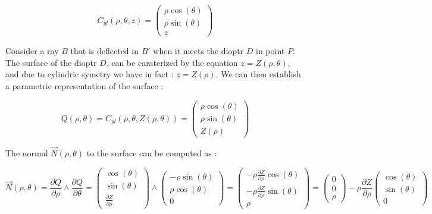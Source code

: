 \begin{equation}
	C_{yl}(\rho,\theta,z)   =\begin{pmatrix} \rho \cos(\theta)  \\ \rho \sin(\theta)   \\ z \end{pmatrix}
	     \label{PC:Cyl:Coord}
\end{equation}

Consider a ray $B$ that is deflected in $B'$ when it meets the dioptr  $D$ in point $P$.
The surface of the dioptr $D$, can be caraterized by the equation $z=Z(\rho,\theta)$, and due to cylindric symetry we have in fact :
$z=Z(\rho)$.  We can then establish a parametric representation of the surface :

\begin{equation}
	Q(\rho,\theta) =  C_{yl}(\rho,\theta,Z(\rho,\theta)) = \begin{pmatrix} \rho \cos(\theta)  \\ \rho \sin(\theta)   \\ Z(\rho) \end{pmatrix}
\end{equation}

The normal $\vec{N}(\rho,\theta) $ to the surface can be computed as :


\begin{equation}
	\vec{N}(\rho,\theta) 
	=  \frac{\partial Q}{\partial \rho} \wedge \frac{\partial Q}{\partial \theta}
	=   \begin{pmatrix} \cos(\theta)  \\  \sin(\theta)   \\    \frac{\partial Z}{\partial \rho}   \end{pmatrix}
            \wedge 
	   \begin{pmatrix} -\rho \sin(\theta)  \\ \rho \cos(\theta)   \\ 0 \end{pmatrix}
	=   \begin{pmatrix}  - \rho \frac{\partial Z}{\partial \rho}  \cos(\theta)  \\  -\rho \frac{\partial Z}{\partial \rho}  \sin(\theta)   \\  \rho     \end{pmatrix}
	=   \begin{pmatrix}  0 \\  0 \\  \rho     \end{pmatrix}
            - \rho \frac{\partial Z}{\partial \rho}   \begin{pmatrix}   \cos(\theta)  \\   \sin(\theta)   \\  0     \end{pmatrix}
		    \label{PC:EqNorm}
\end{equation}

